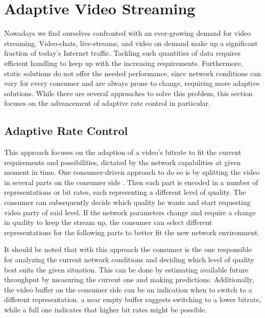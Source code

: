 \section{Adaptive Video Streaming}
Nowadays we find ourselves confronted with an ever-growing demand for video streaming. Video-chats, live-streams, and video on demand make up a significant fraction of today's Internet traffic. Tackling such quantities of data requires efficient handling to keep up with the increasing requirements. Furthermore, static solutions do not offer the needed performance, since network conditions can vary for every consumer and are always prone to change, requiring more adaptive solutions. While there are several approaches to solve this problem, this section focuses on the advancement of adaptive rate control in particular. 

\subsection{Adaptive Rate Control}
This approach focuses on the adaption of a video's bitrate to fit the current requirements and possibilities, dictated by the network capabilities at given moment in time. One consumer-driven approach to do so is by splitting the video in several parts on the consumer side \cite{MQGW12}. Then each part is encoded in a number of representations or bit rates, each representing a different level of quality. The consumer can subsequently decide which quality he wants and start requesting video party of said level. If the network parameters change and require a change in quality to keep the stream up, the consumer can select different representations for the following parts to better fit the new network environment.

It should be noted that with this approach the consumer is the one responsible for analyzing the current network conditions and deciding which level of quality best suits the given situation. This can be done by estimating available future throughput by measuring the current one and making predictions. Additionally, the video buffer on the consumer side can be an indication when to switch to a different representation. a near empty buffer suggests switching to a lower bitrate, while a full one indicates that higher bit rates might be possible. \cite{MQGW12}

